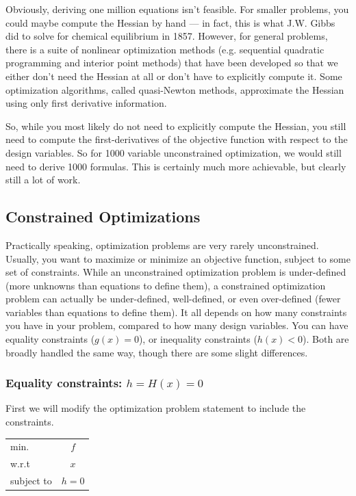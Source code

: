 \documentclass[conf]{new-aiaa}
\begin{document}
    Obviously, deriving one million equations isn't feasible. 
    For smaller problems, you could maybe compute the Hessian by hand --- in fact, this is what J.W. Gibbs did to solve for chemical equilibrium in 1857.
    However, for general problems, there is a suite of nonlinear optimization methods (e.g. sequential quadratic programming and interior point methods) that have been developed so that we either don't need the Hessian at all or don't have to explicitly compute it. 
    Some optimization algorithms, called quasi-Newton methods, approximate the Hessian using only first derivative information.

    So, while you most likely do not need to explicitly compute the Hessian, you still need to compute the first-derivatives of the objective function with respect to the design variables. 
    So for 1000 variable unconstrained optimization, we would still need to derive 1000 formulas. 
    This is certainly much more achievable, but clearly still a lot of work. 

    \subsection{Constrained Optimizations}
        
    Practically speaking, optimization problems are very rarely unconstrained. 
    Usually, you want to maximize or minimize an objective function, subject to some set of constraints. 
    While an unconstrained optimization problem is under-defined (more unknowns than equations to define them), 
    a constrained optimization problem can actually be under-defined, well-defined, or even over-defined (fewer variables than equations to define them). 
    It all depends on how many constraints you have in your problem, compared to how many design variables. 
    You can have equality constraints ($g(x) = 0$), or inequality constraints ($h(x) < 0$). 
    Both are broadly handled the same way, though there are some slight differences. 


        \subsubsection{Equality constraints: $h = H(x) = 0$}
        First we will modify the optimization problem statement to include the constraints. 
        \begin{table}[H]
            \centering
            \begin{tabular}{lc}
                \hline
                min. & $f$ \\
                w.r.t & $x$ \\ 
                subject to & $h = 0$ \\ \hline 
            \end{tabular}
        \end{table}
\end{document}
